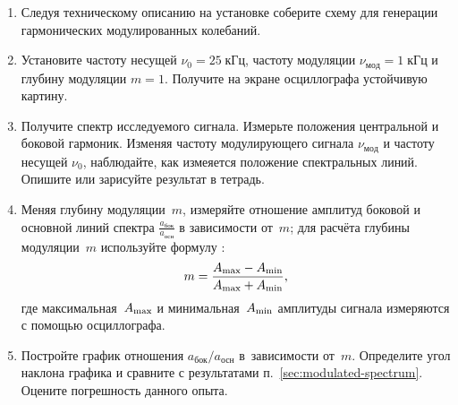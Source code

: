 \begin{lab:task}
\begin{enumerate}
\item Следуя техническому описанию на установке соберите схему для
генерации гармонических модулированных колебаний.

\item Установите частоту несущей $\nu_0=25\;кГц$, частоту модуляции
$\nu_{мод} = 1\;кГц$ и глубину модуляции $m=1$.
Получите на экране осциллографа устойчивую картину.

\item Получите спектр исследуемого сигнала. Измерьте положения центральной
и боковой гармоник. Изменяя частоту модулирующего сигнала $\nu_{мод}$
и частоту несущей $\nu_0$, наблюдайте, как измеяется положение спектральных линий.
Опишите или зарисуйте результат в тетрадь.

\item Меняя глубину модуляции~$m$, измеряйте отношение амплитуд
боковой и основной линий спектра $\frac{a_\text{бок}}{a_\text{осн}}$
в зависимости от~$m$;
для расчёта глубины модуляции~$m$ используйте формулу :
\begin{equation*}
    m = \frac{A_{\rm max} - A_{\rm min}}{A_{\rm max} + A_{\rm min}},
\end{equation*}
где максимальная~$A_{\rm max}$ и минимальная~$A_{\rm min}$ амплитуды сигнала
измеряются с помощью осциллографа.

\item Постройте график отношения $a_\text{бок}/a_\text{осн}$
в~зависимости от~$m$. Определите угол наклона графика и сравните
с результатами п.~\ref{sec:modulated-spectrum}. Оцените погрешность данного опыта.
\end{enumerate}

\end{lab:task}





